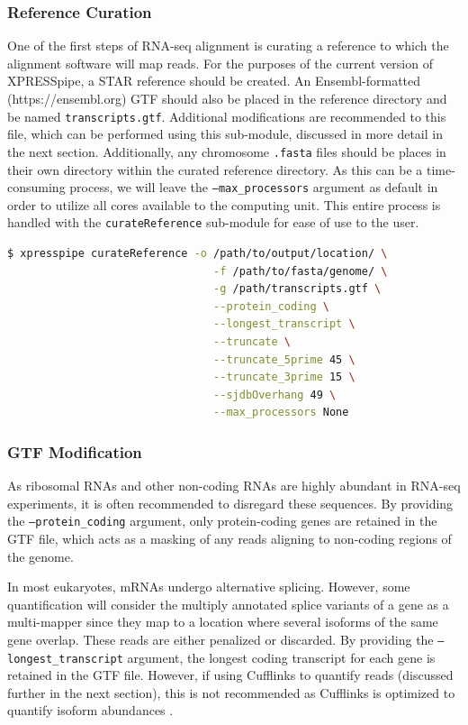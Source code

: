 \documentclass[11pt, a4paper, oneside]{article}
\begin{document}
\subsubsection{Reference Curation}
One of the first steps of RNA-seq alignment is curating a reference to which the alignment software will map reads. For the purposes of the current version of XPRESSpipe, a STAR \cite{star} reference should be created. An Ensembl-formatted (https://ensembl.org) GTF should also be placed in the reference directory and be named \texttt{transcripts.gtf}. Additional modifications are recommended to this file, which can be performed using this sub-module, discussed in more detail in the next section. Additionally, any chromosome \texttt{.fasta} files should be places in their own directory within the curated reference directory. As this can be a time-consuming process, we will leave the \texttt{--max\_processors} argument as default in order to utilize all cores available to the computing unit. This entire process is handled with the \texttt{curateReference} sub-module for ease of use to the user.
\newline
\begin{lstlisting}[language=bash, caption=curateReference example]
$ xpresspipe curateReference -o /path/to/output/location/ \
                                -f /path/to/fasta/genome/ \
                                -g /path/transcripts.gtf \
                                --protein_coding \
                                --longest_transcript \
                                --truncate \
                                --truncate_5prime 45 \
                                --truncate_3prime 15 \
                                --sjdbOverhang 49 \
                                --max_processors None
\end{lstlisting}


\subsubsection{GTF Modification}
As ribosomal RNAs and other non-coding RNAs are highly abundant in RNA-seq experiments, it is often recommended to disregard these sequences. By providing the \texttt{--protein\_coding} argument, only protein-coding genes are retained in the GTF file, which acts as a masking of any reads aligning to non-coding regions of the genome. \par

In most eukaryotes, mRNAs undergo alternative splicing. However, some quantification will consider the multiply annotated splice variants of a gene as a multi-mapper since they map to a location where several isoforms of the same gene overlap. These reads are either penalized or discarded. By providing the \texttt{--longest\_transcript} argument, the longest coding transcript for each gene is retained in the GTF file. However, if using Cufflinks to quantify reads (discussed further in the next section), this is not recommended as Cufflinks is optimized to quantify isoform abundances \cite{cufflinks}. \par
\end{document}
